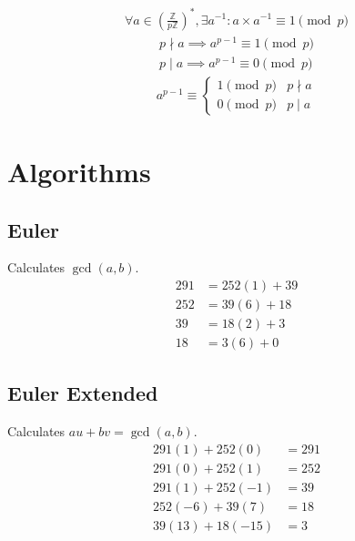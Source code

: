 \documentclass{article}
\newcommand{\soft}[1]{\left( #1 \right)}
\begin{document}
\begin{multicols*}{2}
\begin{align*}
    \forall a \in \soft{\frac{\mathbb{Z}}{p\mathbb{Z}}}^*, \exists a^{-1} : a \times a^{-1} \equiv 1 \pmod{p}
\end{align*}
\begin{align*}
    p \nmid a \implies a^{p-1} \equiv 1 \pmod{p} \\
    p  \mid a \implies a^{p-1} \equiv 0 \pmod{p}
\end{align*}
\begin{align*}
    a^{p-1} \equiv \begin{cases}
        1 \pmod{p} & p \nmid a \\
        0 \pmod{p} & p  \mid a
    \end{cases}
\end{align*}

\section*{Algorithms}

\subsection*{Euler}
Calculates $\gcd(a, b)$.
\begin{align*}
    291 &= 252(1) + 39        \\
    252 &= 39(6)  + 18        \\
    39  &= 18(2)  + \boxed{3} \\
    18  &= 3(6)   + 0
\end{align*}

\subsection*{Euler Extended}
Calculates $au + bv = \gcd(a, b)$.
\begin{align*}
    291(1)  + 252(0)  &= 291 \\
    291(0)  + 252(1)  &= 252 \\
    291(1)  + 252(-1) &= 39  \\
    252(-6) + 39(7)   &= 18  \\
    39(13)  + 18(-15) &= 3
\end{align*}


\end{multicols*}
\end{document}
